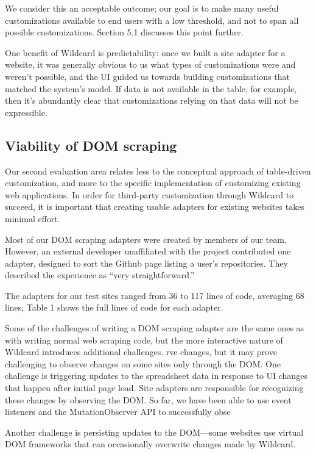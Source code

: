 \documentclass[sigplan,screen,10pt,anonymous,review]{acmart}
\begin{document}
We consider this an acceptable outcome; our goal is to make many useful
customizations available to end users with a low threshold, and not to
span all possible customizations. Section 5.1 discusses this point
further.

One benefit of Wildcard is predictability: once we built a site adapter
for a website, it was generally obvious to us what types of
customizations were and weren't possible, and the UI guided us towards
building customizations that matched the system's model. If data is not
available in the table, for example, then it's abundantly clear that
customizations relying on that data will not be expressible.

\hypertarget{viability-of-dom-scraping}{%
\subsection{Viability of DOM scraping}\label{viability-of-dom-scraping}}

Our second evaluation area relates less to the conceptual approach of
table-driven customization, and more to the specific implementation of
customizing existing web applications. In order for third-party
customization through Wildcard to succeed, it is important that creating
usable adapters for existing websites takes minimal effort.

Most of our DOM scraping adapters were created by members of our team.
However, an external developer unaffiliated with the project contributed
one adapter, designed to sort the Github page listing a user's
repositories. They described the experience as ``very straightforward.''

The adapters for our test sites ranged from 36 to 117 lines of code,
averaging 68 lines; Table 1 shows the full lines of code for each
adapter.

Some of the challenges of writing a DOM scraping adapter are the same
ones as with writing normal web scraping code, but the more interactive
nature of Wildcard introduces additional challenges. rve changes, but it
may prove challenging to observe changes on some sites only through the
DOM. One challenge is triggering updates to the spreadsheet data in
response to UI changes that happen after initial page load. Site
adapters are responsible for recognizing these changes by observing the
DOM. So far, we have been able to use event listeners and the
MutationObserver API to successfully obse

Another challenge is persisting updates to the DOM---some websites use
virtual DOM frameworks that can occasionally overwrite changes made by
Wildcard.
\end{document}
